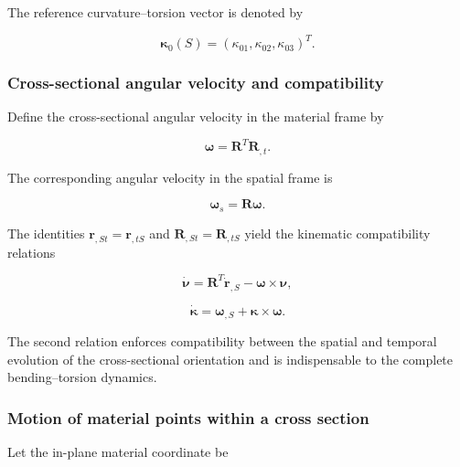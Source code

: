 The reference curvature--torsion vector is denoted by

\begin{equation}
\label{eq:rod-1-15}
\bm{\kappa}_{0}(S) = \left( \kappa_{01},\kappa_{02},\kappa_{03} \right)^{T}.
\end{equation}

\subsubsection{Cross-sectional angular velocity and compatibility}\label{sec:rod-1-2-5}

Define the cross-sectional angular velocity in the material frame by

\begin{equation}
\label{eq:rod-1-16}
\widehat{\bm{\omega}} = \mathbf{R}^{T}\mathbf{R}_{,t}.
\end{equation}

The corresponding angular velocity in the spatial frame is

\begin{equation}
\label{eq:rod-1-17}
\bm{\omega}_{s} = \mathbf{R}\bm{\omega}.
\end{equation}

The identities \(\mathbf{r}_{,St} = \mathbf{r}_{,tS}\) and \(\mathbf{R}_{,St} = \mathbf{R}_{,tS}\) yield the kinematic compatibility relations\cite{Simo1985FiniteStrainBeam,Antman2005Elasticity,Sola2018MicroLie}

\begin{equation}
\label{eq:rod-1-18}
\dot{\bm{\nu}} = \mathbf{R}^{T}{\dot{\mathbf{r}}}_{,S} - \bm{\omega} \times \bm{\nu},
\end{equation}

\begin{equation}
\label{eq:rod-1-19}
\dot{\bm{\kappa}} = \bm{\omega}_{,S} + \bm{\kappa} \times \bm{\omega}.
\end{equation}

The second relation enforces compatibility between the spatial and temporal evolution of the cross-sectional orientation and is indispensable to the complete bending--torsion dynamics.

\subsubsection{Motion of material points within a cross section}\label{sec:rod-1-2-6}

Let the in-plane material coordinate be

